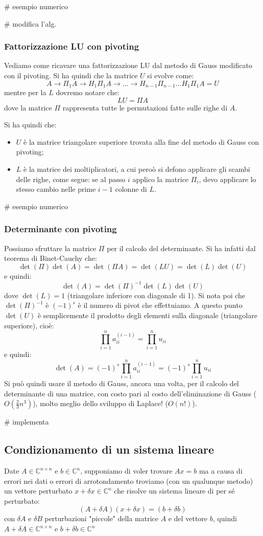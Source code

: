 \documentclass[a4paper,11pt]{article}
\begin{document}
# esempio numerico

# modifica l'alg.

\subsubsection{Fattorizzazione LU con pivoting}
Vediamo come ricavare una fattorizzazione LU dal metodo di Gauss modificato con il pivoting.
Si ha quindi che la matrice $U$ si evolve come:
$$
A \rightarrow \Pi_1 A \rightarrow H_1 \Pi_1 A \rightarrow ... \rightarrow H_{n - 1} \Pi_{n - 1} ... H_1 \Pi_1 A = U 
$$
mentre per la $L$ dovremo notare che:
$$
LU = \Pi A
$$
dove la matrice $\Pi$ rappresenta tutte le permutazioni fatte sulle righe di $A$.

Si ha quindi che:
\begin{itemize}
	\item $U$ è la matrice triangolare superiore trovata alla fine del metodo di Gauss con pivoting;
	\item $L$ è la matrice dei moltiplicatori, a cui peroò si defono applicare gli scambi delle righe, come segue: se al passo $i$ applico la matrice $\Pi_i$, devo applicare lo stesso cambio nelle prime $i - 1$ colonne di $L$.
\end{itemize}

# esempio numerico

\subsubsection{Determinante con pivoting}
Possiamo sfruttare la matrice $\Pi$ per il calcolo del determinante.
Si ha infatti dal teorema di Binet-Cauchy che:
$$
\det(\Pi) \det(A) = \det(\Pi A) = \det(L U) = \det(L) \det(U)
$$
e quindi:
$$
\det(A) = \det(\Pi)^{-1} \det(L) \det(U)
$$
dove $\det(L) = 1$ (triangolare inferiore con diagonale di 1).
Si nota poi che $\det(\Pi)^{-1}$ è $(-1)^s$ è il numero di pivot che effettuiamo.
A questo punto $\det(U)$ è semplicemente il prodotto degli elementi sulla diagonale (triangolare superiore), cioè:
$$
\prod_{i = 1}^n a_{ii}^{(i - 1)} = \prod_{i = 1}^n u_{ii}
$$
e quindi:
$$
\det(A) = (-1)^s \prod_{i = 1}^n a_{ii}^{(i - 1)} = (-1)^s \prod_{i = 1}^n u_{ii}
$$
Si può quindi usare il metodo di Gauss, ancora una volta, per il calcolo del determinante di una matrice, con costo pari al costo dell'eliminazione di Gauss ($O(\frac{2}{3}n^3)$), molto meglio dello sviluppo di Laplace! ($O(n!)$).

# implementa 

\subsection{Condizionamento di un sistema lineare}
Date $A \in \mathbb{C}^{n \times n}$ e $b \in \mathbb{C}^n$, supponiamo di voler trovare $Ax = b$ ma a causa di errori nei dati o errori di arrotondamento troviamo (con un qualunque metodo) un vettore perturbato $x + \delta x \in \mathbb{C}^n$ che risolve un sistema lineare di per sé perturbato:
$$
(A + \delta A) (x + \delta x) = (b + \delta b)
$$
con $\delta A$ e $\delta B$ perturbazioni "piccole" della matrice $A$ e del vettore $b$, quindi $A + \delta A \in \mathbb{C}^{n \times n}$ e $b + \delta b \in \mathbb{C}^n$
\end{document}
